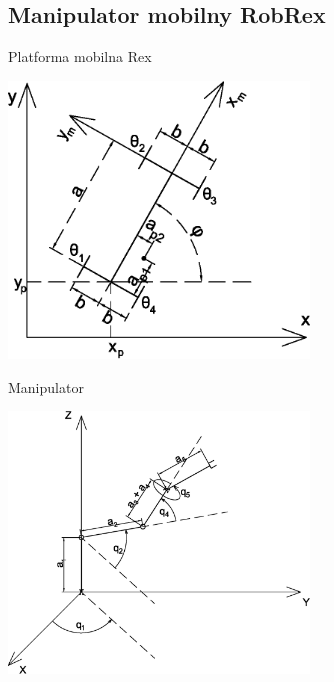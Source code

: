 \documentclass{beamer}
\begin{document}
\subsection{Manipulator mobilny RobRex}
\begin{frame}{Platforma mobilna Rex}
\begin{center}
\includegraphics[width=0.6\textwidth]{img/robrex.eps}
\end{center}
\end{frame}

\begin{frame}{Manipulator}
\begin{center}
\includegraphics[width=0.6\textwidth]{img/manip.eps}
\end{center}
\end{frame}
\end{document}

